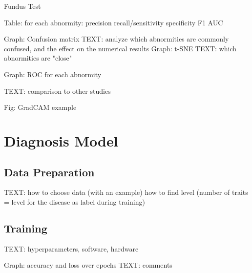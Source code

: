 \documentclass{article}
\begin{document}
				\begin{table}[htbp]
					\centering
					\caption{Fundus Test}
					\label{tb:Fundus_test}
				\end{table}
				
				Table: for each abnormity:
					precision
					recall/sensitivity
					specificity
					F1
					AUC
					
				Graph: Confusion matrix
				TEXT: analyze which abnormities are commonly confused, and the effect on the numerical results
				Graph: t-SNE
				TEXT: which abnormities are "close"
				
				Graph: ROC for each abnormity
				
				TEXT: comparison to other studies
				
			Fig: GradCAM example
		
	\section{Diagnosis Model}
	
		\subsection{Data Preparation}
		
			TEXT: how to choose data (with an example)
			how to find level (number of traits = level for the disease as label during training)
			
		
		\subsection{Training}
			
			TEXT: hyperparameters, software, hardware
			
			Graph: accuracy and loss over epochs
			TEXT: comments
				
\end{document}
